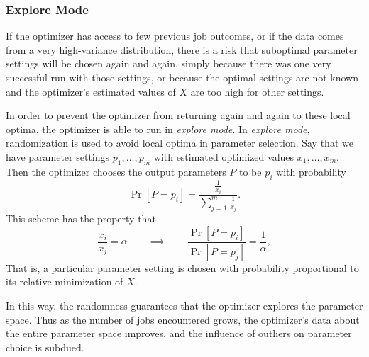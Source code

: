 \subsubsection{Explore Mode}
\label{sec:explore}
If the optimizer has access to few previous job outcomes, or if the data
comes from a very high-variance distribution, there is a risk that 
suboptimal parameter settings will be chosen again and again, simply 
because there was one very successful run with those settings, or because
the optimal settings are not known and the optimizer's estimated values
of $X$ are too high for other settings.

In order to prevent the optimizer from returning again and again to
these local optima, the optimizer is able to run in {\em explore mode}. 
In {\em explore mode}, randomization is
used to avoid local optima in parameter selection. Say that we have 
parameter settings $p_1, \ldots, p_m$ with estimated optimized values 
$x_1, \ldots, x_m$. Then the optimizer chooses the output parameters $P$ 
to be $p_i$ with probability
\[
\Pr[P = p_i] = \frac{\frac{1}{x_i}}{\sum_{j = 1}^m \frac{1}{x_j}}.
\]
This scheme has the property that 
\[
\frac{x_i}{x_j} = \alpha\qquad \implies \qquad \frac{\Pr[P = p_i]}{\Pr[P = p_j]} = \frac{1}{\alpha},
\]
That is, a 
particular parameter setting is chosen with probability proportional 
to its relative minimization of $X$.

In this way, the randomness guarantees that the optimizer explores the 
parameter space. Thus as the number of jobs encountered grows, 
the optimizer's data about the entire parameter space improves, and the
influence of outliers on parameter choice is subdued. 


